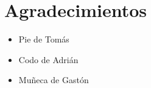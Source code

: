 \documentclass[12pt,a4paper]{article}
\numberwithin{equation}{section}
\begin{document}
\section{Agradecimientos}

\begin{itemize}
	\item Pie de Tomás
	\item Codo de Adrián
	\item Muñeca de Gastón
\end{itemize}
\end{document}

